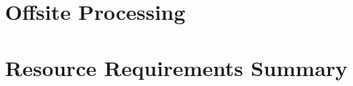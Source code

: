 \documentclass[12pt,twoside]{article}
\begin{document}
\section {Offsite Processing}
\label{sec:offsite}


\section {Resource Requirements Summary}
\label{sec:resources}





%

%

\listoftodos[To Do]



\end{document}

